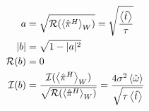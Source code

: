 \begin{onehalfspace}
    \begin{align}
        a &= \sqrt{\mathcal{R}(\expval{\hat{\pi}^{H}}_W)} = \sqrt{\frac{\expval{\hat{t}}}{\tau}}\label{eq:amplitude_a}\\
        |b| &= \sqrt{1 - |a|^2}\label{eq:amplitude_b}\\
        \mathcal{R}(b) &= 0\label{eq:real_part_b}\\
        \mathcal{I}(b) &= \frac{\mathcal{I}(\expval{\hat{\pi}^{H}}_W)}{\sqrt{\mathcal{R}(\expval{\hat{\pi}^{H}}_W)}} = \frac{4\sigma^2 \expval{\hat{\omega}}}{\sqrt{\tau\expval{\hat{t}}}}\label{eq:imaginary_part_b}
    \end{align}










\end{onehalfspace}
